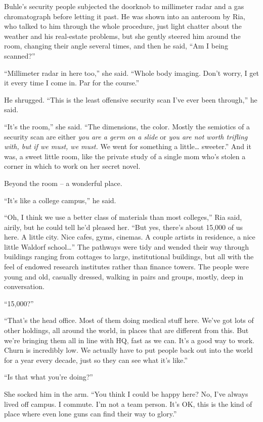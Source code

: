 \tb

Buhle's security people subjected the doorknob to millimeter radar and 
a gas chromatograph before letting it past. He was shown into an 
anteroom by Ria, who talked to him through the whole procedure, just 
light chatter about the weather and his real-estate problems, but she 
gently steered him around the room, changing their angle several times, 
and then he said, “Am I being scanned?”

“Millimeter radar in here too,” she said. “Whole body imaging. 
Don't worry, I get it every time I come in. Par for the course.”

He shrugged. “This is the least offensive security scan I've ever 
been through,” he said.

“It's the room,” she said. “The dimensions, the color. Mostly the 
semiotics of a security scan are either \emph{you are a germ on a 
slide} or \emph{you are not worth trifling with, but if we must, we 
must.} We went for something a little\ldots{} sweeter.” And it was, a 
sweet little room, like the private study of a single mom who's stolen 
a corner in which to work on her secret novel.

Beyond the room -- a wonderful place.

“It's like a college campus,” he said.

“Oh, I think we use a better class of materials than most 
colleges,” Ria said, airily, but he could tell he'd pleased her. 
“But yes, there's about 15,000 of us here. A little city. Nice cafes, 
gyms, cinemas. A couple artists in residence, a nice little Waldorf 
school\ldots{}” The pathways were tidy and wended their way through 
buildings ranging from cottages to large, institutional buildings, but 
all with the feel of endowed research institutes rather than finance 
towers. The people were young and old, casually dressed, walking in 
pairs and groups, mostly, deep in conversation.

“15,000?”

“That's the head office. Most of them doing medical stuff here. We've 
got lots of other holdings, all around the world, in places that are 
different from this. But we're bringing them all in line with HQ, fast 
as we can. It's a good way to work. Churn is incredibly low. We 
actually have to put people back out into the world for a year every 
decade, just so they can see what it's like.”

“Is that what you're doing?”

She socked him in the arm. “You think I could be happy here? No, I've 
always lived off campus. I commute. I'm not a team person. It's OK, 
this is the kind of place where even lone guns can find their way to 
glory.”

